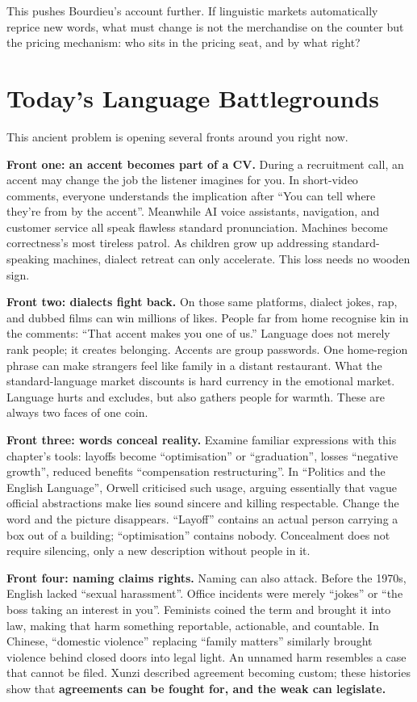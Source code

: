 This pushes Bourdieu's account further. If linguistic markets automatically reprice new words, what must change is not the merchandise on the counter but the pricing mechanism: who sits in the pricing seat, and by what right?

\section{Today's Language Battlegrounds}
This ancient problem is opening several fronts around you right now.

\textbf{Front one: an accent becomes part of a CV.} During a recruitment call, an accent may change the job the listener imagines for you. In short-video comments, everyone understands the implication after ``You can tell where they're from by the accent''. Meanwhile AI voice assistants, navigation, and customer service all speak flawless standard pronunciation. Machines become correctness's most tireless patrol. As children grow up addressing standard-speaking machines, dialect retreat can only accelerate. This loss needs no wooden sign.

\textbf{Front two: dialects fight back.} On those same platforms, dialect jokes, rap, and dubbed films can win millions of likes. People far from home recognise kin in the comments: ``That accent makes you one of us.'' Language does not merely rank people; it creates belonging. Accents are group passwords. One home-region phrase can make strangers feel like family in a distant restaurant. What the standard-language market discounts is hard currency in the emotional market. Language hurts and excludes, but also gathers people for warmth. These are always two faces of one coin.

\textbf{Front three: words conceal reality.} Examine familiar expressions with this chapter's tools: layoffs become ``optimisation'' or ``graduation'', losses ``negative growth'', reduced benefits ``compensation restructuring''. In ``Politics and the English Language'', Orwell criticised such usage, arguing essentially that vague official abstractions make lies sound sincere and killing respectable. Change the word and the picture disappears. ``Layoff'' contains an actual person carrying a box out of a building; ``optimisation'' contains nobody. Concealment does not require silencing, only a new description without people in it.

\textbf{Front four: naming claims rights.} Naming can also attack. Before the 1970s, English lacked ``sexual harassment''. Office incidents were merely ``jokes'' or ``the boss taking an interest in you''. Feminists coined the term and brought it into law, making that harm something reportable, actionable, and countable. In Chinese, ``domestic violence'' replacing ``family matters'' similarly brought violence behind closed doors into legal light. An unnamed harm resembles a case that cannot be filed. Xunzi described agreement becoming custom; these histories show that \textbf{agreements can be fought for, and the weak can legislate.}

